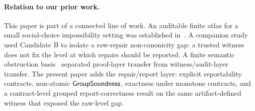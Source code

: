 \paragraph{Relation to our prior work.}
This paper is part of a connected line of work.  An auditable finite atlas for
a small social-choice impossibility setting was established
in~\citep{hayashida2026atlas}.  A companion study~\citep{hayashida2026repair}
used Candidate B to isolate a raw-repair non-canonicity gap: a trusted witness
does not fix the level at which repairs should be reported.  A finite semantic
obstruction basis~\citep{hayashida2026obstruction} separated proof-layer
transfer from witness/audit-layer transfer.  The present paper adds the
repair/report layer: explicit reportability contracts, non-atomic
\(\mathsf{GroupSoundness}\), exactness under monotone contracts, and a contract-level
grouped report-correctness result on the same artifact-defined witness that
exposed the raw-level gap.
